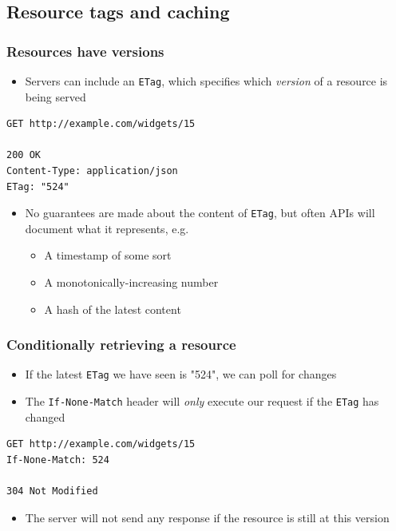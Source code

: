 \documentclass[8pt]{article}
\begin{document}
\subsection{Resource tags and caching}
\label{sec:org3eb731d}
\subsubsection{Resources have versions}
\label{sec:org9f63254}
\begin{itemize}
\item Servers can include an \texttt{ETag}, which specifies which \emph{version} of a resource is being served
\end{itemize}
\begin{verbatim}
GET http://example.com/widgets/15

200 OK
Content-Type: application/json
ETag: "524"
\end{verbatim}
\begin{itemize}
\item No guarantees are made about the content of \texttt{ETag}, but often APIs will document what it represents, e.g.
\begin{itemize}
\item A timestamp of some sort
\item A monotonically-increasing number
\item A hash of the latest content
\end{itemize}
\end{itemize}
\subsubsection{Conditionally retrieving a resource}
\label{sec:org5134670}
\begin{itemize}
\item If the latest \texttt{ETag} we have seen is "524", we can poll for changes
\item The \texttt{If-None-Match} header will \emph{only} execute our request if the \texttt{ETag} has changed
\end{itemize}
\begin{verbatim}
GET http://example.com/widgets/15
If-None-Match: 524

304 Not Modified
\end{verbatim}
\begin{itemize}
\item The server will not send any response if the resource is still at this version
\end{itemize}
\end{document}

